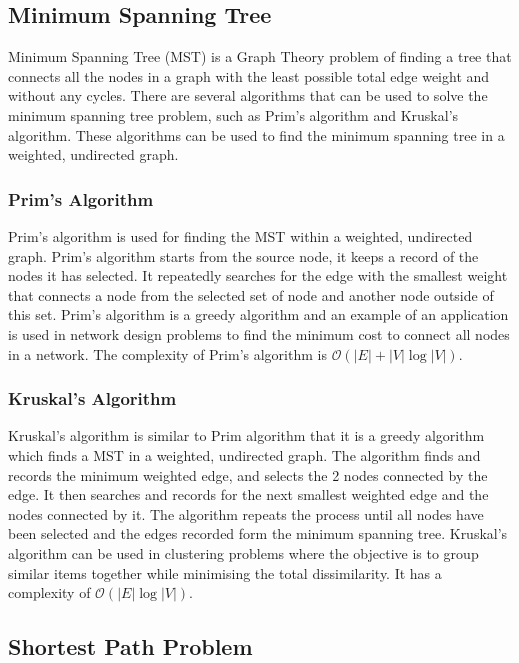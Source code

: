 \subsection{Minimum Spanning Tree}

Minimum Spanning Tree (MST) is a Graph Theory problem of finding a tree that connects all the nodes in a graph with the least possible total edge weight and without any cycles. There are several algorithms that can be used to solve the minimum spanning tree problem, such as Prim's algorithm and Kruskal's algorithm. These algorithms can be used to find the minimum spanning tree in a weighted, undirected graph.

\subsubsection{Prim's Algorithm}

Prim's algorithm is used for finding the MST within a weighted, undirected graph. Prim's algorithm starts from the source node, it keeps a record of the nodes it has selected. It repeatedly searches for the edge with the smallest weight that connects a node from the selected set of node and another node outside of this set. Prim's algorithm is a greedy algorithm and an example of an application is used in network design problems to find the minimum cost to connect all nodes in a network. The complexity of Prim's algorithm is $\mathcal{O}(|E|+|V|\log |V|)$.

\subsubsection{Kruskal's Algorithm}

Kruskal's algorithm is similar to Prim algorithm that it is a greedy algorithm which finds a MST in a weighted, undirected graph. The algorithm finds and records the minimum weighted edge, and selects the 2 nodes connected by the edge. It then searches and records for the next smallest weighted edge and the nodes connected by it. The algorithm repeats the process until all nodes have been selected and the edges recorded form the minimum spanning tree. Kruskal's algorithm can be used in clustering problems where the objective is to group similar items together while minimising the total dissimilarity. It has a complexity of $\mathcal{O}(|E|\log |V|)$.

\subsection{Shortest Path Problem}

